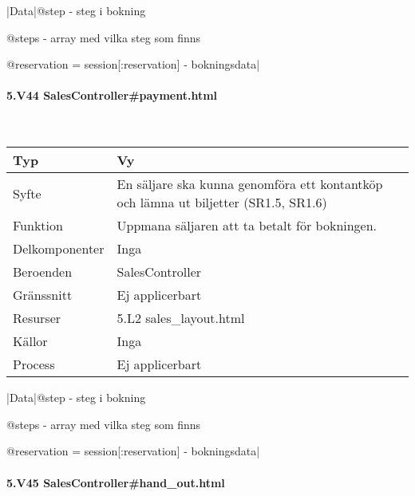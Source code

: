 \documentclass[a4paper, twoside, 11pt, titlepage]{article}
\begin{document}
			|Data|@step - steg i bokning

			@steps - array med vilka steg som finns

			@reservation = session[:reservation] - bokningsdata|

			\paragraph{5.V44 SalesController\#payment.html}\

			\begin {table} [ht] \begin{tabular} {  p{3.5cm} p{9.6cm} }
				\hline
				Typ & Vy  \\
				\hline
				Syfte & En säljare ska kunna genomföra ett kontantköp och lämna ut biljetter (SR1.5, SR1.6)  \\
				\hline
				Funktion & Uppmana säljaren att ta betalt för bokningen.  \\
				\hline
				Delkomponenter & Inga  \\
				\hline
				Beroenden & SalesController  \\
				\hline
				Gränssnitt & Ej applicerbart  \\
				\hline
				Resurser & 5.L2 sales\_layout.html  \\
				\hline
				Källor & Inga  \\
				\hline
				Process & Ej applicerbart  \\
				\hline
			\end{tabular} \end{table} \FloatBarrier
			\vspace{6mm}

			|Data|@step - steg i bokning

			@steps - array med vilka steg som finns

			@reservation = session[:reservation] - bokningsdata|

			\paragraph{5.V45 SalesController\#hand\_out.html}\
\end{document}

